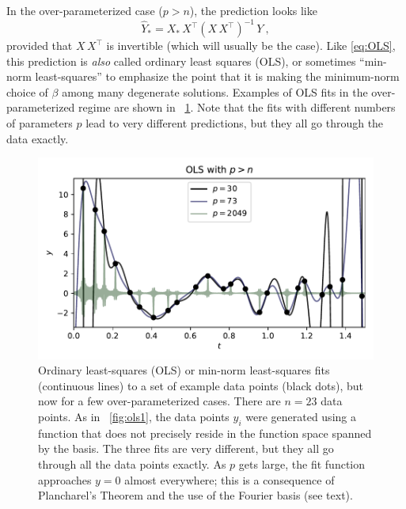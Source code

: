 \documentclass[12pt,letterpaper]{article}
\newlength{\figurewidth}
\begin{document}
In the over-parameterized case ($p>n$), the prediction looks like
\begin{equation}\label{eq:OLS2}
    \hat{Y}_\ast = X_\ast\,X^\top (X\,X^\top)^{-1}\,Y
    ~,
\end{equation}
provided that $X\,X^\top$ is invertible (which will usually be the case).
Like \eqref{eq:OLS}, this prediction is \emph{also} called ordinary least squares (OLS), or sometimes ``min-norm least-squares'' to emphasize the point that it is making the minimum-norm choice of $\beta$ among many degenerate solutions.
Examples of OLS fits in the over-parameterized regime are shown in \figurename~\ref{fig:ols2}.
Note that the fits with different numbers of parameters $p$ lead to very different predictions, but they all go through the data exactly.
\begin{figure}[t]
    \begin{mdframed}
    \includegraphics[width=\figurewidth]{./OLS-over.pdf}
    \caption{Ordinary least-squares (OLS) or min-norm least-squares fits (continuous lines) to a set of example data points (black dots), but now for a few over-parameterized cases. There are $n=23$ data points. As in \figurename~\ref{fig:ols1}, the data points $y_i$ were generated using a function that does not precisely reside in the function space spanned by the basis. The three fits are very different, but they all go through all the data points exactly. As $p$ gets large, the fit function approaches $y=0$ almost everywhere; this is a consequence of Plancharel's Theorem and the use of the Fourier basis (see text).}
    \label{fig:ols2}
    \end{mdframed}
\end{figure}
\end{document}
